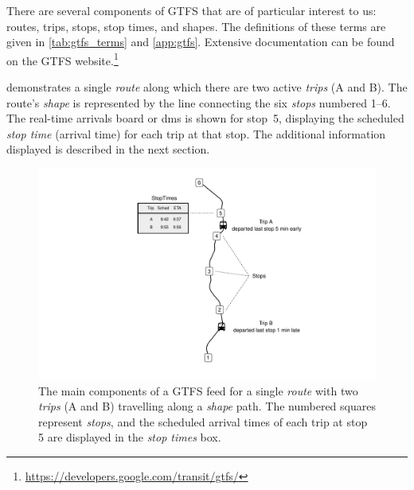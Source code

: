 There are several components of GTFS that are of particular interest to us: routes, trips, stops, stop times, and shapes. The definitions of these terms are given in \cref{tab:gtfs_terms} and \cref{app:gtfs}. Extensive documentation can be found on the GTFS website.\footnote{\url{https://developers.google.com/transit/gtfs/}}


 demonstrates a single \emph{route} along which there are two active \emph{trips} (A and B). The route's \emph{shape} is represented by the line connecting the six \emph{stops} numbered 1--6. The real-time arrivals board or \gls{dms} is shown for stop~5, displaying the scheduled \emph{stop time} (arrival time) for each trip at that stop. The additional information displayed is described in the next section.



\begin{knitrout}\small
{}\color{fgcolor}\begin{figure}

{\centering \includegraphics[width=\textwidth]{figure/gtfs_nw-1} 

}

\caption[The main components of a GTFS feed]{The main components of a GTFS feed for a single \emph{route} with two \emph{trips} (A and B) travelling along a \emph{shape} path. The numbered squares represent \emph{stops}, and the scheduled arrival times of each trip at stop 5 are displayed in the \emph{stop times} box.}\label{fig:gtfs_nw}
\end{figure}


\end{knitrout}



